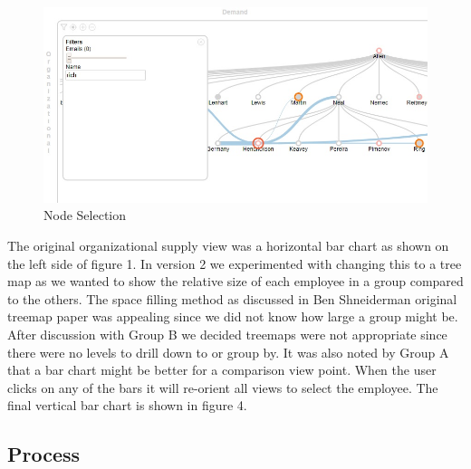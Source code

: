 \message{ !name(FinalPaper.tex)}\documentclass[journal]{vgtc}                %
\begin{document}
\begin{figure}
	\centering
	\includegraphics[width=\columnwidth]{pictures/orgdemand.jpg}
	\caption{Node Selection}
	\label{fig:global}
\end{figure}

The original organizational supply view was a horizontal bar chart as shown on the left side of figure 1.  In version 2 we experimented with changing this to a tree map as we wanted to show the relative size of each employee in a group compared to the others.  The space filling method\cite{shneiderman1992tree} as discussed in Ben Shneiderman original treemap paper was appealing since we did not know how large a group might be.  After discussion with Group B we decided treemaps were not appropriate since there were no levels to drill down to or group by.  It was also noted by Group A that a bar chart might be better for a comparison view point.  When the user clicks on any of the bars it will re-orient all views to select the employee.  The final vertical bar chart is shown in figure 4.



\subsection{Process}
\end{document}
